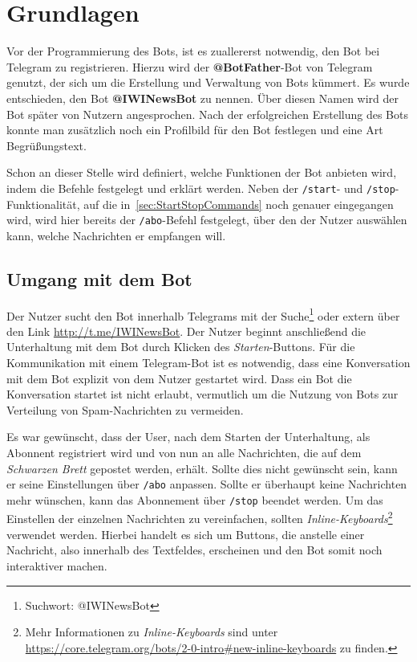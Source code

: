 \chapter{Grundlagen}
Vor der Programmierung des Bots, ist es zuallererst notwendig, den Bot bei Telegram zu registrieren. Hierzu wird der \textbf{@BotFather}-Bot von Telegram genutzt, der sich um die Erstellung und Verwaltung von Bots kümmert. Es wurde entschieden, den Bot \textbf{@IWINewsBot} zu nennen. Über diesen Namen wird der Bot später von Nutzern angesprochen. Nach der erfolgreichen Erstellung des Bots konnte man zusätzlich noch ein Profilbild für den Bot festlegen und eine Art Begrüßungstext.

Schon an dieser Stelle wird definiert, welche Funktionen der Bot anbieten wird, indem die Befehle festgelegt und erklärt werden. Neben der \texttt{/start}- und \texttt{/stop}-Funktionalität, auf die in~\autoref{sec:StartStopCommands} noch genauer eingegangen wird, wird hier bereits der \texttt{/abo}-Befehl festgelegt, über den der Nutzer auswählen kann, welche Nachrichten er empfangen will.

\section{Umgang mit dem Bot}
Der Nutzer sucht den Bot innerhalb Telegrams mit der Suche\footnote{Suchwort: @IWINewsBot} oder extern über den Link \url{http://t.me/IWINewsBot}.
Der Nutzer beginnt anschließend die Unterhaltung mit dem Bot durch Klicken des \textit{Starten}-Buttons.
Für die Kommunikation mit einem Telegram-Bot ist es notwendig, dass eine Konversation mit dem Bot explizit von dem Nutzer gestartet wird. Dass ein Bot die Konversation startet ist nicht erlaubt, vermutlich um die Nutzung von Bots zur Verteilung von Spam-Nachrichten zu vermeiden.

Es war gewünscht, dass der User, nach dem Starten der Unterhaltung, als Abonnent registriert wird und von nun an alle Nachrichten, die auf dem \emph{Schwarzen Brett} gepostet werden, erhält. Sollte dies nicht gewünscht sein, kann er seine Einstellungen über \texttt{/abo} anpassen. Sollte er überhaupt keine Nachrichten mehr wünschen, kann das Abonnement über \texttt{/stop} beendet werden. Um das Einstellen der einzelnen Nachrichten zu vereinfachen, sollten \emph{Inline-Keyboards}\footnote{Mehr Informationen zu \emph{Inline-Keyboards} sind unter \url{https://core.telegram.org/bots/2-0-intro\#new-inline-keyboards} zu finden.} verwendet werden. Hierbei handelt es sich um Buttons, die anstelle einer Nachricht, also innerhalb des Textfeldes, erscheinen und den Bot somit noch interaktiver machen.

